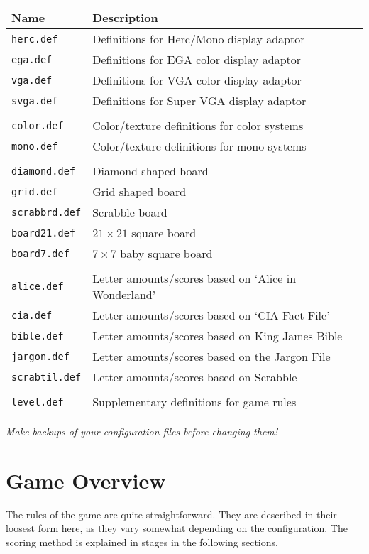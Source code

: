 \begin{tabular}{|l|l|}
\hline
Name & Description\\
\hline
{\tt herc.def}	&	Definitions for Herc/Mono display adaptor\\
{\tt ega.def}	&	Definitions for EGA color display adaptor\\
{\tt vga.def}	&	Definitions for VGA color display adaptor\\
{\tt svga.def}	&	Definitions for Super VGA display adaptor\\
 & \\
{\tt color.def}	&	Color/texture definitions for color systems\\
{\tt mono.def}	&	Color/texture definitions for mono systems\\
 & \\
{\tt diamond.def} &	Diamond shaped board\\
{\tt grid.def}	  &	Grid shaped board\\
{\tt scrabbrd.def}&	Scrabble board\\
{\tt board21.def} &	$21\times21$ square board\\
{\tt board7.def}  &	$7\times7$ baby square board\\
 & \\
{\tt alice.def}	&	Letter amounts/scores based on `Alice in
Wonderland'\\
{\tt cia.def}	&	Letter amounts/scores based on `CIA Fact
File'\\
{\tt bible.def} &	Letter amounts/scores based on King James
Bible\\
{\tt jargon.def}&	Letter amounts/scores based on the Jargon
File\\
{\tt scrabtil.def} &	Letter amounts/scores based on Scrabble\\
 & \\
{\tt level.def}	&	Supplementary definitions for game rules\\
\hline
\end{tabular}

{\em Make backups of your configuration files before changing them!}

\section{Game Overview}

The rules of the game are quite straightforward. They are described
in their loosest form here, as they vary somewhat depending on the
configuration. The scoring method is explained in stages in the
following sections.

